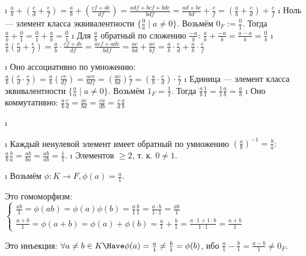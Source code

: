 \begin{solution}
\begin{enumerate}
\begin{itemize}
    \begin{itemize}
    \tightlist
    \i
      \(\frac{a}{b} + (\frac{c}{d} + \frac{e}{f}) = \frac{a}{b} + (\frac{cf+de}{df}) = \frac{adf+bcf+bde}{bdf} = \frac{ad+bc}{bd}+\frac{e}{f} = (\frac{a}{b} + \frac{c}{d}) + \frac{e}{f}\)
    \i
      Ноль --- элемент класса эквивалентности \(\{\frac{0}{a} \mid a \ne 0\}\). Возьмём \(0_F := \frac{0}{1}\). Тогда \(\frac{a}{b} + \frac{0}{1} = \frac{0}{1} + \frac{a}{b} = \frac{0}{1}\)
    \i
      Для \(\frac{a}{b}\) обратный по сложению \(\frac{-a}{b}\): \(\frac{a}{b}+\frac{-a}{b} = \frac{a-a}{b} = \frac{0}{b}\)
    \i
      \(\frac{a}{b} (\frac{c}{d} + \frac{e}{f}) = \frac{a}{b} \cdot \frac{cf+de}{df} = \frac{acf+ade}{bdf} = \frac{ac}{bd}+\frac{ae}{bf} = \frac{a}{b}\cdot \frac{c}{d}+\frac{a}{b} \cdot \frac{e}{f}\)
    \end{itemize}
  \i
    Оно ассоциативно по умножению: \(\frac{a}{b} (\frac{c}{d} \cdot \frac{e}{f}) = \frac{a}{b} (\frac{ce}{df} ) = \frac{ace}{bdf} = (\frac{ac}{bd}) \frac{e}{f} = (\frac{a}{b} \cdot \frac{c}{d}) \cdot \frac{e}{f}\)
  \i
    Единица --- элемент класса эквивалентности \(\{\frac{a}{a} \mid a \ne 0\}\). Возьмём \(1_F = \frac{1}{1}\). Тогда \(\frac{a}{b} \frac{1}{1} = \frac{1}{1} \frac{a}{b} = \frac{a}{b}\)
  \i
    Оно коммутативно: \(\frac{a}{b} \frac{c}{d} = \frac{ac}{bd} = \frac{ca}{db} = \frac{c}{d} \frac{a}{b}\)
  \end{itemize}
\i
  \begin{itemize}
  \tightlist
  \i
    Каждый ненулевой элемент имеет обратный по умножению \((\frac{a}{b})^{-1} = \frac{b}{a}\): \(\frac{a}{b} \frac{b}{a} = \frac{ab}{ba} = \frac{ab}{ab} = \frac{1}{1}\).
  \i
    Элементов \(\ge 2\), т. к. \(0 \ne 1\).
  \end{itemize}
\i
  Возьмём \(\phi: K \to F, \phi(a) = \frac{a}{1}\).

  Это гомоморфизм: 
  $\begin{cases} 
    \frac{ab}{1} = \phi(ab) = \phi(a)\phi(b) = \frac{a}{1}\frac{b}{1} = \frac{a\cdot b}{1\cdot 1} = \frac{ab}{1}\\
    \frac{a+b}{1} = \phi(a+b) = \phi(a)+\phi(b) = \frac{a}{1}+\frac{b}{1} = \frac{a\cdot 1+1 \cdot b}{1\cdot 1} = \frac{a+b}{1}
  \end{cases}$

  Это инъекция: \(\forall a \ne b \in K \Have \phi(a) = \frac{a}{1} \ne \frac{b}{1} = \phi(b)\), ибо \(\frac{a}{1} - \frac{b}{1} = \frac{a-b}{1} \ne 0_F\).
\end{enumerate}

\end{solution}

